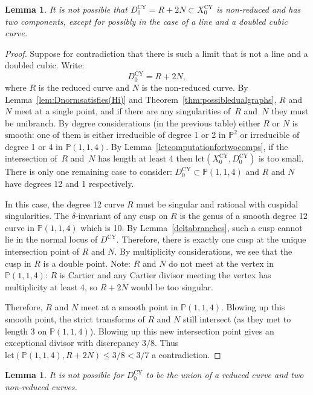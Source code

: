 \documentclass[JEP,XML,SOM,Unicode,NoFloatCountersInSection,published]{cedram}
\theoremstyle{plain}
\newtheorem{lemma}[theorem]{Lemma}
\theoremstyle{definition}
\newcommand\PP{{\mathbb{P}}}
\newcommand\lct{\mathrm{lct}}
\newcommand\Dcy{{D^{\mathrm{CY}}}}
\newcommand\Dcyo{{D^{\mathrm{CY}}_0}}
\newcommand\Xcyo{{X^{\mathrm{CY}}_0}}
\begin{document}
\begin{lemma}\label{nonredtwocomps}
It is not possible that $\Dcyo=R+2N\subset \Xcyo$ is non-reduced and has two components, except for possibly in the case of a line and a doubled cubic curve.
\end{lemma}

\begin{proof}
Suppose for contradiction that there is such a limit that is not a line and a doubled cubic. Write:
\[
\Dcyo = R+2N,
\]
where $R$ is the reduced curve and $N$ is the non-reduced curve. By Lemma~\ref{lem:Dnormsatisfies(Hi)} and Theorem~\ref{thm:possibledualgraphs}, $R$ and $N$ meet at a single point, and if there are any singularities of~$R$ and~$N$ they must be unibranch. By degree considerations (in the previous table) either $R$ or $N$ is smooth: one of them is either irreducible of degree 1 or 2 in $\PP^2$ or irreducible of degree 1 or 4 in $\PP(1,1,4)$. By Lemma~\ref{lctcomputationfortwocomps}, if the intersection of~$R$ and~$N$ has length at least 4 then $\lct(\Xcyo,\Dcyo)$ is too small. There is only one remaining case to consider: $\Dcyo\subset \PP(1,1,4)$ and $R$ and $N$ have degrees 12 and 1 respectively.

In this case, the degree 12 curve $R$ must be singular and rational with cuspidal singularities. The $\delta$-invariant of any cusp on $R$ is the genus of a smooth degree 12 curve in $\PP(1,1,4)$ which is 10. By Lemma~\ref{deltabranches}, such a cusp cannot lie in the normal locus of $\Dcy$. Therefore, there is exactly one cusp at the unique intersection point of $R$ and $N$. By multiplicity considerations, we see that the cusp in $R$ is a double point. Note: $R$ and $N$ do not meet at the vertex in $\PP(1,1,4)$: $R$ is Cartier and any Cartier divisor meeting the vertex has multiplicity at least 4, so $R+2N$ would be too singular.

Therefore, $R$ and $N$ meet at a smooth point in $\PP(1,1,4)$. Blowing up this smooth point, the strict transforms of $R$ and $N$ still intersect (as they met to length 3 on $\PP(1,1,4)$). Blowing up this new intersection point gives an exceptional divisor with discrepancy $3/8$. Thus $\lct(\PP(1,1,4),R+2N)\le 3/8<3/7$ a contradiction.
\end{proof}

\begin{lemma}\label{twononredonered} It is not possible for $\Dcyo$ to be the union of a reduced curve and two non-reduced curves.
\end{lemma}
\end{document}
